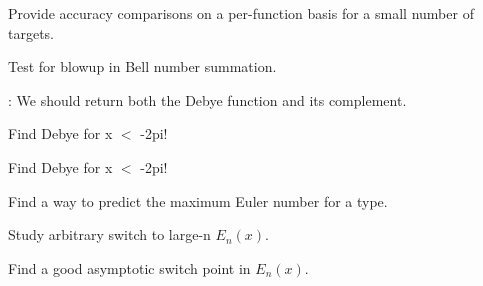 
\begin{DoxyRefList}
\item[\label{todo__todo000001}%
\Hypertarget{todo__todo000001}%
Module \hyperlink{group__mathsf}{mathsf} ]Provide accuracy comparisons on a per-\/function basis for a small number of targets. 
\item[\label{todo__todo000016}%
\Hypertarget{todo__todo000016}%
Member \hyperlink{namespacestd_1_1____detail_acab68a50669a465d6bddc7a54a649819}{std\+:\+:\+\_\+\+\_\+detail\+:\+:\+\_\+\+\_\+bell\+\_\+series} (unsigned int \+\_\+\+\_\+n)]Test for blowup in Bell number summation.  
\item[\label{todo__todo000018}%
\Hypertarget{todo__todo000018}%
Member \hyperlink{namespacestd_1_1____detail_a26d3f285cfbcaba6fa30d3e4164c6187}{std\+:\+:\+\_\+\+\_\+detail\+:\+:\+\_\+\+\_\+debye} (unsigned int \+\_\+\+\_\+n, \+\_\+\+Tp \+\_\+\+\_\+x)]\+: We should return both the Debye function and it\textquotesingle{}s complement. 

Find Debye for x $<$ -\/2pi! 

Find Debye for x $<$ -\/2pi!  
\item[\label{todo__todo000004}%
\Hypertarget{todo__todo000004}%
Member \hyperlink{namespacestd_1_1____detail_a2e3eb67dee4d0b5c96824a4e8e9c227e}{std\+:\+:\+\_\+\+\_\+detail\+:\+:\+\_\+\+\_\+euler\+\_\+series} (unsigned int \+\_\+\+\_\+n)]Find a way to predict the maximum Euler number for a type.  
\item[\label{todo__todo000007}%
\Hypertarget{todo__todo000007}%
Member \hyperlink{namespacestd_1_1____detail_a0282700710ec07b8ca095fe2ec140d6e}{std\+:\+:\+\_\+\+\_\+detail\+:\+:\+\_\+\+\_\+expint} (unsigned int \+\_\+\+\_\+n, \+\_\+\+Tp \+\_\+\+\_\+x)]Study arbitrary switch to large-\/n $ E_n(x) $. 

Find a good asymptotic switch point in $ E_n(x) $. 


\end{DoxyRefList}
